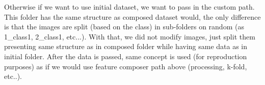 \newline
Otherwise if we want to use initial dataset, we want to pass in the custom path. This folder has the same structure as composed dataset would, the only difference is that the images are split (based on the class) in sub-folders on random (as 1{\_}class1, 2{\_}class1, etc...). With that, we did not modify images, just split them presenting same structure as in composed folder while having same data as in initial folder. After the data is passed, same concept is used (for reproduction purposes) as if we would use feature composer path above (processing, k-fold, etc..).